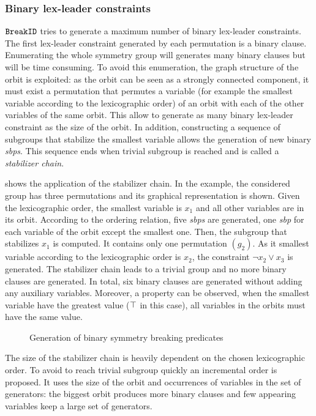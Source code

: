 \subsubsection{Binary lex-leader constraints}

$\texttt{BreakID}$ tries to generate a maximum number of binary lex-leader constraints.
The first lex-leader constraint generated by each permutation is a binary clause.
Enumerating the whole symmetry group will generates many binary clauses but will be time consuming.
To avoid this enumeration, the  graph structure  of the orbit is exploited: as the orbit can be seen as a strongly connected component, it must exist a permutation that permutes a variable (for example the smallest variable according to the lexicographic order) of an orbit with each of the other variables of the same orbit. This allow to
generate as many binary lex-leader constraint as the size of the orbit. In addition, constructing 
a sequence of subgroups that stabilize the smallest variable allows the generation of new binary \textit{sbps}.
This sequence ends when trivial subgroup is reached and is called a  \emph{stabilizer chain}.

 shows the application of the stabilizer chain.
In the example, the considered group has three permutations and its graphical representation
is shown. Given the lexicographic order, the smallest variable is $x_1$ and 
all other variables are in its orbit. According to the ordering relation, five 
\textit{sbps} are generated, one \textit{sbp} for each variable of the orbit except the smallest one.
Then, the subgroup that stabilizes $x_1$ is computed. It contains only one permutation $(g_2)$.
As it smallest variable according to the lexicographic order is $x_2$, the constraint $\neg x_2 \lor x_3$ is generated. The stabilizer chain leads to a trivial group and no more binary clauses are generated.
In total, six binary clauses are generated without adding any auxiliary variables.
Moreover, a property can be observed, when the smallest variable have the greatest value 
($\top$ in this case), all variables in the orbits must have the same value.
 \begin{figure}[!htbp]
 
 \caption{Generation of binary symmetry breaking predicates}
 \label{fig:binary_sbp}
\end{figure}

The size of the stabilizer chain is heavily dependent on the chosen lexicographic order.
To avoid to reach trivial subgroup quickly an incremental order is proposed.
It uses the size of the orbit and occurrences of variables in the set of generators:
the biggest orbit produces more binary clauses and few appearing variables keep a large set of generators.


